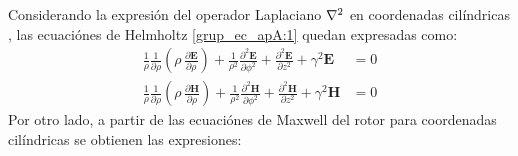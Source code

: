 Considerando la expresión del operador Laplaciano $\nabla^2\mathbf{}$ en coordenadas cilíndricas \cite{walfram_sphe_coord}, las ecuaciónes de Helmholtz \eqref{grup_ec_apA:1} quedan expresadas como:
\begin{subequations}
\label{grup_ec_apA:18}
\begin{align}
\frac{1}{\rho}\frac{1}{\partial\rho}\left(\!\rho\,\frac{\partial\mathbf{E}}{\partial\rho}\right) + \frac{1}{\rho^2}\frac{\partial ^2\mathbf{E}}{\partial\phi^2} +  \frac{\partial ^2\mathbf{E}}{\partial z^2} + \gamma ^2\mathbf{E} &= 0
\label{ec_apA:81}\\
\frac{1}{\rho}\frac{1}{\partial\rho}\left(\!\rho\,\frac{\partial\mathbf{H}}{\partial\rho}\right) + \frac{1}{\rho^2}\frac{\partial ^2\mathbf{H}}{\partial\phi^2} +  \frac{\partial ^2\mathbf{H}}{\partial z^2} + \gamma ^2\mathbf{H} &= 0
\label{ec_apA:82}
\end{align}
\end{subequations}
Por otro lado, a partir de las ecuaciónes de Maxwell del rotor para coordenadas cilíndricas \cite{walfram_sphe_coord} se obtienen las expresiones:

